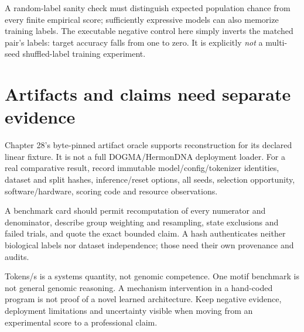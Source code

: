 A random-label sanity check must distinguish expected population chance from every
finite empirical score; sufficiently expressive models can also memorize training
labels. The executable negative control here simply inverts the matched pair's
labels: target accuracy falls from one to zero. It is explicitly \emph{not} a
multi-seed shuffled-label training experiment.

\section{Artifacts and claims need separate evidence}
Chapter 28's byte-pinned artifact oracle supports reconstruction for its declared
linear fixture. It is not a full DOGMA/HermonDNA deployment loader.
For a real comparative result, record immutable model/config/tokenizer identities,
dataset and split hashes, inference/reset options, all seeds, selection opportunity,
software/hardware, scoring code and resource observations.

A benchmark card should permit recomputation of every numerator and denominator,
describe group weighting and resampling, state exclusions and failed trials,
and quote the exact bounded claim. A hash authenticates neither biological labels
nor dataset independence; those need their own provenance and audits.

Tokens/s is a systems quantity, not genomic competence. One motif benchmark
is not general genomic reasoning. A mechanism intervention in a hand-coded program
is not proof of a novel learned architecture. Keep negative evidence, deployment
limitations and uncertainty visible when moving from an experimental score to a
professional claim.

